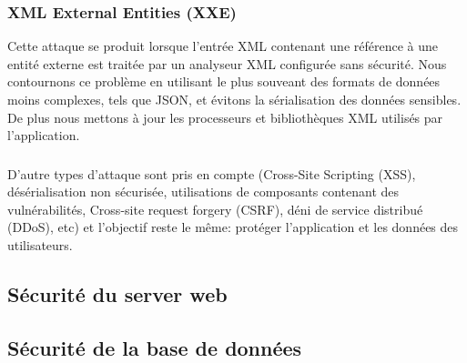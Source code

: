     \subsubsection{XML External Entities (XXE)}   
    Cette attaque se produit lorsque l'entrée XML contenant une référence à une entité externe est 
    traitée par un analyseur XML configurée sans sécurité. 
    Nous contournons ce problème en utilisant le plus souveant des formats de données moins complexes, tels que JSON, 
    et évitons la sérialisation des données sensibles. De plus nous mettons à jour les processeurs et bibliothèques 
    XML utilisés par l'application.

    \subsubsection{}
    \paragraph{}
    D'autre types d'attaque sont pris en compte (Cross-Site Scripting (XSS), 
    désérialisation non sécurisée, utilisations de composants contenant des vulnérabilités,
    Cross-site request forgery (CSRF), déni de service distribué (DDoS), etc) 
    et l'objectif reste le même: protéger l'application et les données des utilisateurs.

\subsection{Sécurité du server web}

\subsection{Sécurité de la base de données}




